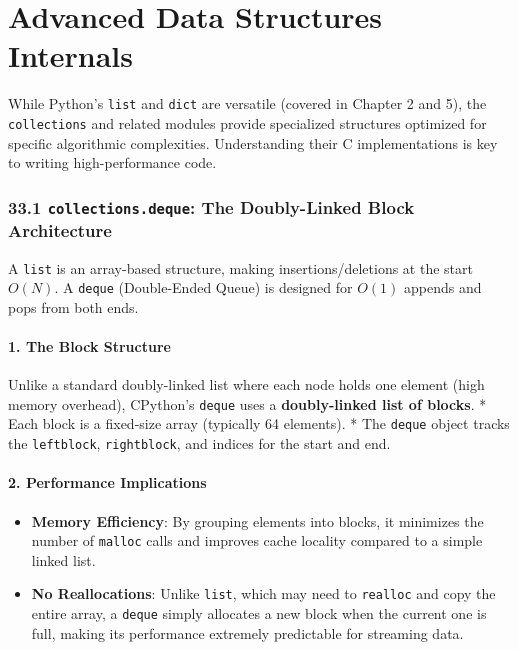 \hypertarget{advanced-data-structures-internals}{%
\chapter{Advanced Data Structures
Internals}\label{advanced-data-structures-internals}}

While Python's \passthrough{\lstinline!list!} and
\passthrough{\lstinline!dict!} are versatile (covered in Chapter 2 and
5), the \passthrough{\lstinline!collections!} and related modules
provide specialized structures optimized for specific algorithmic
complexities. Understanding their C implementations is key to writing
high-performance code.

\hypertarget{collections.deque-the-doubly-linked-block-architecture}{%
\subsection{\texorpdfstring{33.1 \texttt{collections.deque}: The
Doubly-Linked Block
Architecture}{33.1 collections.deque: The Doubly-Linked Block Architecture}}\label{collections.deque-the-doubly-linked-block-architecture}}

A \passthrough{\lstinline!list!} is an array-based structure, making
insertions/deletions at the start \(O(N)\). A
\passthrough{\lstinline!deque!} (Double-Ended Queue) is designed for
\(O(1)\) appends and pops from both ends.

\hypertarget{the-block-structure}{%
\subsubsection{1. The Block Structure}\label{the-block-structure}}

Unlike a standard doubly-linked list where each node holds one element
(high memory overhead), CPython's \passthrough{\lstinline!deque!} uses a
\textbf{doubly-linked list of blocks}. * Each block is a fixed-size
array (typically 64 elements). * The \passthrough{\lstinline!deque!}
object tracks the \passthrough{\lstinline!leftblock!},
\passthrough{\lstinline!rightblock!}, and indices for the start and end.

\hypertarget{performance-implications}{%
\subsubsection{2. Performance
Implications}\label{performance-implications}}

\begin{itemize}
\tightlist
\item
  \textbf{Memory Efficiency}: By grouping elements into blocks, it
  minimizes the number of \passthrough{\lstinline!malloc!} calls and
  improves cache locality compared to a simple linked list.
\item
  \textbf{No Reallocations}: Unlike \passthrough{\lstinline!list!},
  which may need to \passthrough{\lstinline!realloc!} and copy the
  entire array, a \passthrough{\lstinline!deque!} simply allocates a new
  block when the current one is full, making its performance extremely
  predictable for streaming data.
\end{itemize}


